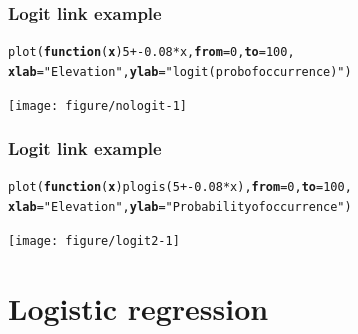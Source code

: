 \documentclass[color=usenames,dvipsnames]{beamer}\usepackage[]{graphicx}\usepackage[]{xcolor}
\makeatletter
\newcommand{\hlnum}[1]{\textcolor[rgb]{0.69,0.494,0}{#1}}%
\newcommand{\hlstr}[1]{\textcolor[rgb]{0.749,0.012,0.012}{#1}}%
\newcommand{\hlopt}[1]{\textcolor[rgb]{0,0,0}{#1}}%
\newcommand{\hlstd}[1]{\textcolor[rgb]{0,0,0}{#1}}%
\newcommand{\hlkwa}[1]{\textcolor[rgb]{0,0,0}{\textbf{#1}}}%
\newcommand{\hlkwc}[1]{\textcolor[rgb]{0,0,0}{\textbf{#1}}}%
\newcommand{\hlkwd}[1]{\textcolor[rgb]{0.004,0.004,0.506}{#1}}%
\newenvironment{kframe}{%
 \def\at@end@of@kframe{}%
 \ifinner\ifhmode%
  \def\at@end@of@kframe{\end{minipage}}%
  \begin{minipage}{\columnwidth}%
 \fi\fi%
 \def\FrameCommand##1{\hskip\@totalleftmargin \hskip-\fboxsep
 \colorbox{shadecolor}{##1}\hskip-\fboxsep
     \hskip-\linewidth \hskip-\@totalleftmargin \hskip\columnwidth}%
 \MakeFramed {\advance\hsize-\width
   \@totalleftmargin\z@ \linewidth\hsize
   \@setminipage}}%
 {\par\unskip\endMakeFramed%
 \at@end@of@kframe}
\newenvironment{knitrout}{}{} %
\makeatother
\begin{document}
\begin{frame}[fragile]
  \frametitle{Logit link example}
\begin{knitrout}\scriptsize
{}\color{fgcolor}\begin{kframe}
\begin{alltt}
\hlkwd{plot}\hlstd{(}\hlkwa{function}\hlstd{(}\hlkwc{x}\hlstd{)} \hlnum{5} \hlopt{+ -}\hlnum{0.08}\hlopt{*}\hlstd{x,} \hlkwc{from}\hlstd{=}\hlnum{0}\hlstd{,} \hlkwc{to}\hlstd{=}\hlnum{100}\hlstd{,}
     \hlkwc{xlab}\hlstd{=}\hlstr{"Elevation"}\hlstd{,} \hlkwc{ylab}\hlstd{=}\hlstr{"logit(prob of occurrence)"}\hlstd{)}
\end{alltt}
\end{kframe}
\end{knitrout}
\centering
  \texttt{[image: figure/nologit-1]} \\
\end{frame}




\begin{frame}[fragile]
  \frametitle{Logit link example}
\begin{knitrout}\scriptsize
{}\color{fgcolor}\begin{kframe}
\begin{alltt}
\hlkwd{plot}\hlstd{(}\hlkwa{function}\hlstd{(}\hlkwc{x}\hlstd{)} \hlkwd{plogis}\hlstd{(}\hlnum{5} \hlopt{+ -}\hlnum{0.08}\hlopt{*}\hlstd{x),} \hlkwc{from}\hlstd{=}\hlnum{0}\hlstd{,} \hlkwc{to}\hlstd{=}\hlnum{100}\hlstd{,}
     \hlkwc{xlab}\hlstd{=}\hlstr{"Elevation"}\hlstd{,} \hlkwc{ylab}\hlstd{=}\hlstr{"Probability of occurrence"}\hlstd{)}
\end{alltt}
\end{kframe}
\end{knitrout}
\centering
  \texttt{[image: figure/logit2-1]} \\
\end{frame}





\section{Logistic regression}
\end{document}
